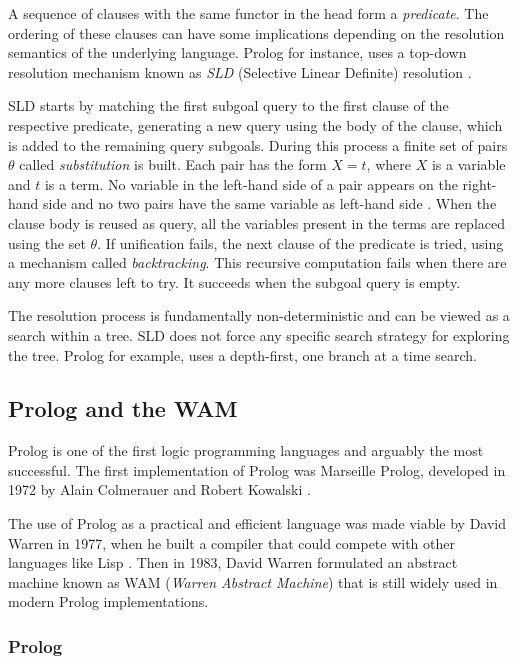 A sequence of clauses with the same functor in the head form a \textit{predicate}. The ordering
of these clauses can have some implications depending on the resolution semantics of the underlying language.
Prolog for instance, uses a top-down resolution mechanism known as \textit{SLD} (Selective Linear Definite) resolution \cite{Lloyd-87}.

SLD starts by matching the first subgoal query to the first clause of the respective predicate,
generating a new query using the body of the clause, which is added to the remaining query subgoals.
During this process a finite set of pairs $\theta$ called \textit{substitution} is built.
Each pair has the form $X = t$, where $X$ is a variable and $t$ is a term. No variable in the left-hand side
of a pair appears on the right-hand side and no two pairs have the same variable as left-hand side \cite{Sterling-94}. 
When the clause body is reused as query, all the variables present in the terms are replaced using the
set $\theta$. 
If unification fails, the next clause of the predicate is tried, using a mechanism called \textit{backtracking}.
This recursive computation fails when there are any more clauses left to try. It succeeds when the subgoal query is empty.

The resolution process is fundamentally non-deterministic and can be viewed as a search within a tree. SLD
does not force any specific search strategy for exploring the tree. Prolog for example, uses a depth-first, one
branch at a time search.

\subsection{Prolog and the WAM}
  
Prolog is one of the first logic programming languages and arguably the most successful.
The first implementation of Prolog was Marseille Prolog, developed in 1972 by Alain Colmerauer and Robert Kowalski \cite{Kowalski-74}.

The use of Prolog as a practical and efficient language was made viable by David Warren in 1977, when he built a compiler that could
compete with other languages like Lisp \cite{Warren-77}. Then in 1983, David Warren formulated an abstract machine known as WAM
(\textit{Warren Abstract Machine}) \cite{Warren-83} that is still widely used in modern Prolog implementations.

\subsubsection{Prolog}

